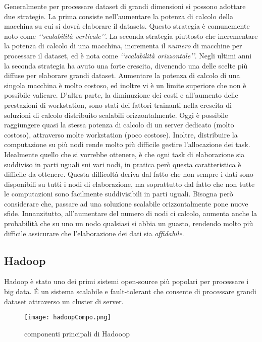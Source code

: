  Generalmente per processare dataset di grandi dimensioni si possono adottare due strategie.
La prima consiste nell'aumentare la potenza di calcolo della macchina su cui si dovrà elaborare il datasets. Questo strategia è comunemente noto come \emph{\lq\lq scalabilità  verticale\rq\rq}. La seconda strategia  piuttosto che incrementare la potenza di calcolo di una macchina, incrementa il \emph{numero} di macchine per processare il dataset, ed è nota come \emph{\lq\lq scalabilità  orizzontale\rq\rq}.
Negli ultimi anni la seconda strategia ha avuto una forte crescita, divenendo una delle scelte più diffuse per elaborare grandi dataset. Aumentare la potenza di calcolo di una singola macchina è molto costoso, ed inoltre vi è un limite superiore che non è possibile valicare. D'altra parte, la diminuzione dei costi e all'aumento delle prestazioni di workstation, sono stati dei fattori trainanti nella crescita di soluzioni di calcolo distribuito scalabili orizzontalmente. Oggi è possibile raggiungere quasi la stessa potenza di calcolo di un server dedicato (molto costoso), attraverso molte workstation (poco costose). 
Inoltre, distribuire la computazione su più nodi rende molto più difficile gestire l'allocazione dei task. Idealmente quello che si vorrebbe ottenere, è che ogni task di elaborazione sia suddiviso in parti uguali sui vari nodi, in pratica però questa caratteristica è difficile da ottenere.
Questa difficoltà deriva dal fatto che non sempre i dati sono disponibili su tutti i nodi di elaborazione, ma soprattutto dal fatto che non tutte le computazioni sono facilmente suddivisibili in parti uguali.
Bisogna però considerare che, passare ad una soluzione scalabile orizzontalmente pone nuove sfide. Innanzitutto, all'aumentare del numero di nodi ci calcolo, aumenta anche la probabilità che su uno un nodo qualsiasi si abbia un guasto, rendendo molto più difficile assicurare che l'elaborazione dei dati sia \emph{affidabile}.

 \subsection{Hadoop}
Hadoop è stato uno dei primi sistemi open-source più popolari per processare i big data.
\'E un sistema scalabile e fault-tolerant che consente di processare grandi dataset attraverso un cluster di server.  


\begin{figure}[h]
\centering
\texttt{[image: hadoopCompo.png]}
\caption{componenti principali di Hadooop}
\label{fig:hadoopComponets}
\end{figure} 
 

